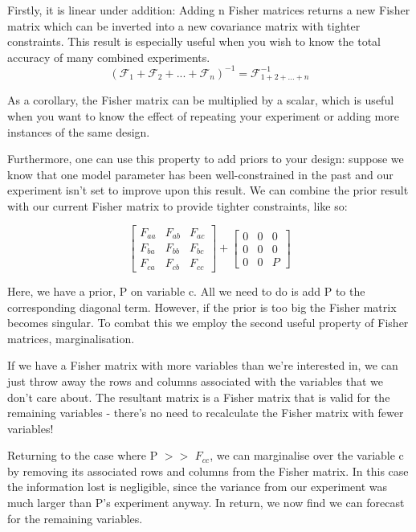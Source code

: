 Firstly, it is linear under addition: Adding n Fisher matrices returns a new Fisher matrix which can be inverted into a new covariance matrix with tighter constraints. This result is especially useful when you wish to know the total accuracy of many combined experiments.
\begin{equation}
(\mathcal{F}_{1} + \mathcal{F}_{2} + ... + \mathcal{F}_{n})^{-1} = \mathcal{F}^{-1}_{1+2+...+n}
\end{equation}

As a corollary, the Fisher matrix can be multiplied by a scalar, which is useful when you want to know the effect of repeating your experiment or adding more instances of the same design.

Furthermore, one can use this property to add priors to your design: suppose we know that one model parameter has been well-constrained in the past and our experiment isn't set to improve upon this result. We can combine the prior result with our current Fisher matrix to provide tighter constraints, like so:

$$ \begin{bmatrix}
F_{aa} & F_{ab} & F_{ac}\\ 
F_{ba} & F_{bb} & F_{bc} \\ 
F_{ca} & F_{cb} & F_{cc}
\end{bmatrix}
+
\begin{bmatrix}
0 & 0 & 0\\ 
0 & 0 & 0 \\ 
0 & 0 & P
\end{bmatrix} $$

Here, we have a prior, P on variable c. All we need to do is add P to the corresponding diagonal term. However, if the prior is too big the Fisher matrix becomes singular. To combat this we employ the second useful property of Fisher matrices, marginalisation.

If we have a Fisher matrix with more variables than we're interested in, we can just throw away the rows and columns associated with the variables that we don't care about. The resultant matrix is a Fisher matrix that is valid for the remaining variables - there's no need to recalculate the Fisher matrix with fewer variables!

Returning to the case where P $>>$ $F_{cc}$, we can marginalise over the variable c by removing its associated rows and columns from the Fisher matrix. In this case the information lost is negligible, since the variance from our experiment was much larger than P's experiment anyway. In return, we now find we can forecast for the remaining variables.

